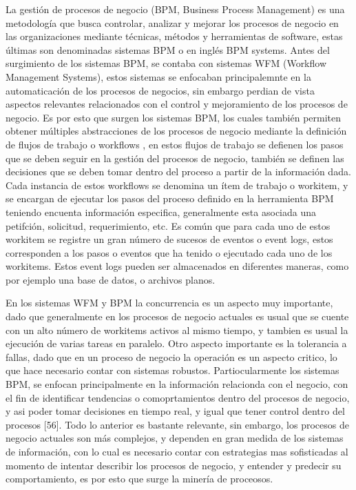 La gestión de procesos de negocio (BPM, Business Process Management) es una metodología que busca controlar, analizar y mejorar los procesos de negocio en las organizaciones mediante técnicas, métodos y herramientas de software, estas últimas son denominadas sistemas BPM o en inglés BPM systems. Antes del surgimiento de los sistemas BPM, se contaba con sistemas WFM (Workflow Management Systems), estos sistemas se enfocaban principalemnte en la automaticación de los procesos de negocios, sin embargo perdian de vista aspectos relevantes relacionados con el control y mejoramiento de los procesos de negocio. Es por esto que surgen los sistemas BPM, los cuales también permiten obtener múltiples abstracciones de los procesos de negocio mediante la definición de flujos de trabajo o workflows \cite{VanderAalst2004}, en estos flujos de trabajo se defienen los pasos que se deben seguir en la gestión del procesos de negocio, también se definen las decisiones que se deben tomar dentro del proceso a partir de la información dada. Cada instancia de estos workflows se denomina un ítem de trabajo o workitem, y se encargan de ejecutar los pasos del proceso definido en la herramienta BPM teniendo encuenta información especifica, generalmente esta asociada una petifción, solicitud, requerimiento, etc. Es común que para cada uno de estos workitem se registre un gran número de sucesos de eventos o event logs, estos corresponden a los pasos o eventos que ha tenido o ejecutado cada uno de los workitems. Estos event logs pueden ser almacenados en diferentes maneras, como por ejemplo una base de datos, o archivos planos. 

En los sistemas WFM y BPM la concurrencia es un aspecto muy importante, dado que generalmente en los procesos de negocio actuales es usual que se cuente con un alto número de workitems activos al mismo tiempo, y tambien es usual la ejecución de varias tareas en paralelo. Otro aspecto importante es la tolerancia a fallas, dado que en un proceso de negocio la operación es un aspecto critico, lo que hace necesario contar con sistemas robustos. Partiocularmente los sistemas BPM, se enfocan principalmente en la información relacionda con el negocio, con el fin de identificar tendencias o comoprtamientos dentro del procesos de negocio, y asi poder tomar decisiones en tiempo real, y igual que tener control dentro del procesos [56]. Todo lo anterior es bastante relevante, sin embargo, los procesos de negocio actuales son más complejos, y dependen en gran medida de los sistemas de información, con lo cual es necesario contar con estrategias mas sofisticadas al momento de intentar describir los procesos de negocio, y entender y predecir su comportamiento, es por esto que surge la minería de proceosos.

